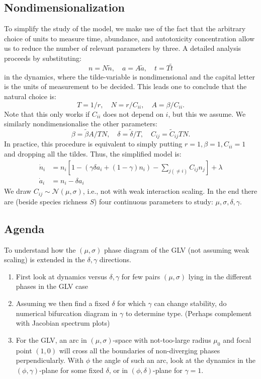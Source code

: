 \documentclass[11pt,a4paper,fleqn]{scrartcl}
\begin{document}
\subsection{Nondimensionalization}
To simplify the study of the model, we make use of the fact that the arbitrary choice of units to measure time, abundance, and autotoxicity concentration allow us to reduce the number of relevant parameters by three. A detailed analysis proceeds by substituting:
\begin{equation}
n = N\tilde{n}, \quad a = A\tilde{a}, \quad t= T\tilde{t}
\end{equation}
in the dynamics, where the tilde-variable is nondimensional and the capital letter is the units of measurement to be decided. This leads one to conclude that the natural choice is:
\begin{equation}
T = 1/r, \quad N= r/C_{ii}, \quad A=\beta/C_{ii}.
\end{equation}
Note that this only works if $C_{ii}$ does not depend on $i$, but this we assume. We similarly nondimensionalise the other parameters:
\begin{equation}
\beta = \tilde{\beta}A/TN, \quad \delta = \tilde{\delta}/T, \quad C_{ij} = \tilde{C}_{ij}TN.
\end{equation}
In practice, this procedure is equivalent to simply putting $r=1,\beta=1,C_{ii}=1$ and dropping all the tildes. Thus, the simplified model is:
\begin{align}
\label{eqnologspecies}
\dot{n}_i &= n_i\left[ 1 - \left(\gamma \delta a_i + (1-\gamma)n_i\right) - \sum_{j(\neq i)} C_{ij} n_j \right] + \lambda\\
\label{eqnologautotox}
\dot{a}_i &= n_i - \delta a_i
\end{align}
We draw $C_{ij}\sim \mathcal{N}(\mu,\sigma)$, i.e., not with weak interaction scaling. In the end there are (beside species richness $S$) four continuous parameters to study: $\mu,\sigma,\delta,\gamma$.

\subsection{Agenda}
To understand how the $(\mu,\sigma)$ phase diagram of the GLV (not assuming weak scaling) is extended in the $\delta,\gamma$ directions.
\begin{enumerate}
    \item First look at dynamics versus $\delta,\gamma$ for few pairs $(\mu,\sigma)$ lying in the different phases in the GLV case
    \item Assuming we then find a fixed $\delta$ for which $\gamma$ can change stability, do numerical bifurcation diagram in $\gamma$ to determine type. (Perhaps complement with Jacobian spectrum plots)
    \item For the GLV, an arc in $(\mu,\sigma)$-space with not-too-large radius $\mu_0$ and focal point $(1,0)$ will cross all the boundaries of non-diverging phases perpendicularly. With $\phi$ the angle of such an arc, look at the dynamics in the $(\phi,\gamma)$-plane for some fixed $\delta$, or in $(\phi,\delta)$-plane for $\gamma=1$.
\end{enumerate}
\end{document}
